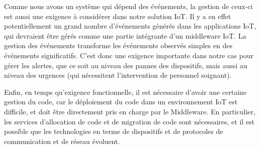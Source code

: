 Comme nous avons un système qui dépend des événements, la gestion de ceux-ci est aussi une exigence à considérer dans notre solution IoT. Il y a en effet potentiellement un grand nombre d'événements générés dans les applications IoT, qui devraient être gérés comme une partie intégrante d'un middleware IoT. La gestion des événements transforme les événements observés simples en des événements significatifs. C'est donc une exigence importante dans notre cas pour gérer les alertes, que ce soit au niveau des pannes des dispositifs, mais aussi au niveau des urgences (qui nécessitent l’intervention de personnel soignant).

Enfin, en temps qu'exigence fonctionnelle, il est nécessaire d'avoir une certaine gestion du code, car le déploiement du code dans un environnement IoT est difficile, et doit être directement pris en charge par le Middleware. En particulier, les services d'allocation de code et de migration de code sont nécessaires, et il est possible que les technologies en terme de dispositifs et de protocoles de communication et de réseau évoluent.